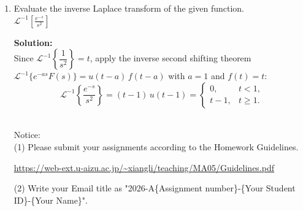 \documentclass[12pt]{scrartcl}
\begin{document}
\begin{enumerate}
\item
Evaluate the inverse Laplace transform of the given function.\\
$\mathcal{L}^{-1}[\frac{e^{-s}}{s^2}]$

\textbf{Solution:} \\

Since $\mathcal{L}^{-1}\!\left\{\dfrac{1}{s^{2}}\right\}=t$, apply the inverse second
shifting theorem $\mathcal{L}^{-1}\{e^{-as}F(s)\}=u(t-a)\,f(t-a)$ with $a=1$ and $f(t)=t$:
\[
\boxed{\;\mathcal{L}^{-1}\!\left\{\frac{e^{-s}}{s^{2}}\right\}=(t-1)\,u(t-1)
=\begin{cases}0,&t<1,\\[2pt] t-1,&t\ge 1.\end{cases}}
\]

\\
Notice: \\
(1) Please submit your assignments according to the Homework Guidelines.

\url{https://web-ext.u-aizu.ac.jp/~xiangli/teaching/MA05/Guidelines.pdf}

(2) Write your Email title as "2026-A\{Assignment number\}-\{Your Student ID\}-\{Your Name\}".


\end{enumerate}
\end{document}
